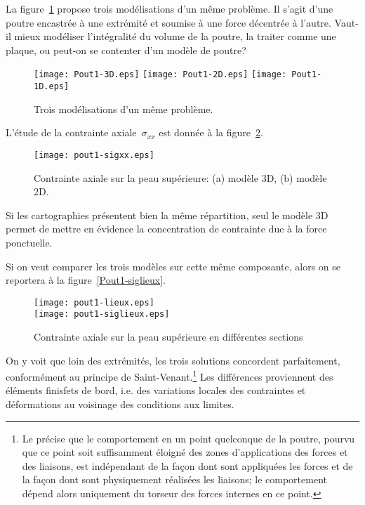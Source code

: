 \bigskip
La figure~\ref{Pout1} propose trois modélisations d'un même problème.
Il s'agit d'une poutre encastrée à une extrémité et soumise à une force
décentrée à l'autre.
Vaut-il mieux modéliser l'intégralité du volume de la poutre, la traiter comme
une plaque, ou peut-on se contenter d'un modèle de poutre?
\begin{figure}[ht]
\centering
\texttt{[image: Pout1-3D.eps]} \hfill
\texttt{[image: Pout1-2D.eps]} \hfill
\texttt{[image: Pout1-1D.eps]}

\caption{\label{Pout1} Trois modélisations d'un même problème.}
\end{figure}

\medskip
L'étude de la contrainte axiale~$\sigma_{xx}$ est donnée à la figure~\ref{Pout1-sigxx}.
\begin{figure}[ht]
\centering
\texttt{[image: pout1-sigxx.eps]}
\caption{\label{Pout1-sigxx} Contrainte axiale sur la peau supérieure: (a) modèle 3D,
(b) modèle 2D.}
\end{figure}
Si les cartographies présentent bien la même répartition, seul le modèle 3D
permet de mettre en évidence la concentration de contrainte due à la force ponctuelle.

\medskip
Si on veut comparer les trois modèles sur cette même composante, alors
on se reportera à la figure~\ref{Pout1-siglieux}.
\begin{figure}[ht]
\centering
\texttt{[image: pout1-lieux.eps]}\\
\texttt{[image: pout1-siglieux.eps]}
\caption{Contrainte axiale sur la peau supérieure en différentes sections}
\end{figure}\label{Pout1-siglieux}
On y voit que loin des extrémités, les trois solutions concordent parfaitement, conformément
au principe de Saint-Venant.\footnote{Le  précise que le comportement
en un point quelconque de la poutre, pourvu que ce point soit suffisamment éloigné des zones
d'applications des forces et des liaisons, est indépendant de la façon dont sont appliquées
les forces et de la façon dont sont physiquement réalisées les liaisons; le comportement
dépend alors uniquement du torseur des forces internes en ce point.}
Les différences proviennent des éléments finisfets de bord, i.e. des variations
locales des contraintes et déformations au voisinage des conditions aux limites.

